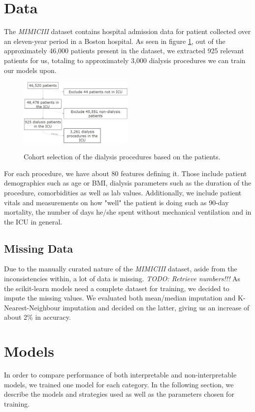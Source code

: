 \documentclass[conference,comsoc]{IEEEtran}
\begin{document}
\section{Data}
The \emph{MIMICIII} dataset contains hospital admission data for patient collected over an eleven-year period in a Boston hospital. 
As seen in figure \ref{fig:cohort}, out of the approximately 46,000 patients present in the dataset, we extracted 925 relevant patients for us, totaling to approximately 3,000 dialysis procedures we can train our models upon.

\begin{figure}[h]
	\includegraphics[width=0.5\textwidth]{cohort.jpg}
	\label{fig:cohort}
	\caption{Cohort selection of the dialysis procedures based on the patients.}
\end{figure}

For each procedure, we have about 80 features defining it. 
Those include patient demographics such as age or BMI, dialysis parameters such as the duration of the procedure, comorbidities as well as lab values. 
Additionally, we include patient vitals and measurements on how "well" the patient is doing such as 90-day mortality, the number of days he/she spent without mechanical ventilation and in the ICU in general.

\subsection{Missing Data}
Due to the manually curated nature of the \emph{MIMICIII} dataset, aside from the inconsistencies within, a lot of data is missing. 
\emph{TODO: Retrieve numbers!!!}
As the scikit-learn models need a complete dataset for training, we decided to impute the missing values. 
We evaluated both mean/median imputation and K-Nearest-Neighbour imputation and decided on the latter, giving us an increase of about 2\% in accuracy.


\section{Models}
In order to compare performance of both interpretable and non-interpretable models, we trained one model for each category. 
In the following section, we describe the models and strategies used as well as the parameters chosen for training.
\end{document}
